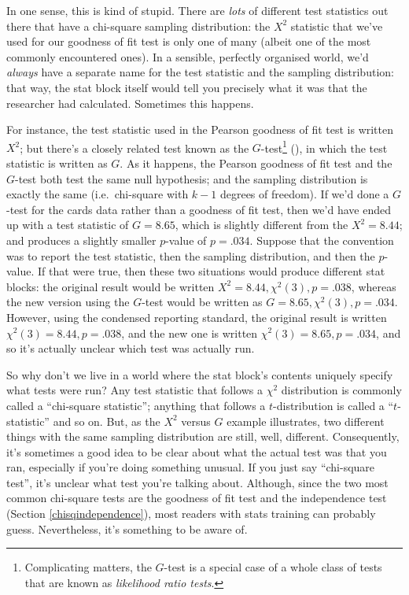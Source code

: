 \documentclass[
  11pt,
  a4paper,
  twoside,symmetric,openright]{book}
\theoremstyle{break}
\theoremstyle{break}
\begin{document}
In one sense, this is kind of stupid. There are \emph{lots} of different test statistics out there that have a chi-square sampling distribution: the \(X^2\) statistic that we've used for our goodness of fit test is only one of many (albeit one of the most commonly encountered ones). In a sensible, perfectly organised world, we'd \emph{always} have a separate name for the test statistic and the sampling distribution: that way, the stat block itself would tell you precisely what it was that the researcher had calculated. Sometimes this happens.

For instance, the test statistic used in the Pearson goodness of fit test is written \(X^2\); but there's a closely related test known as the \(G\)-test\footnote{Complicating matters, the \(G\)-test is a special case of a whole class of tests that are known as \emph{likelihood ratio tests}.} (), in which the test statistic is written as \(G\). As it happens, the Pearson goodness of fit test and the \(G\)-test both test the same null hypothesis; and the sampling distribution is exactly the same (i.e.~chi-square with \(k-1\) degrees of freedom). If we'd done a \(G\)-test for the cards data rather than a goodness of fit test, then we'd have ended up with a test statistic of \(G = 8.65\), which is slightly different from the \(X^2 = 8.44\); and produces a slightly smaller \(p\)-value of \(p = .034\). Suppose that the convention was to report the test statistic, then the sampling distribution, and then the \(p\)-value. If that were true, then these two situations would produce different stat blocks: the original result would be written \(X^2 = 8.44, \chi^2(3), p = .038\), whereas the new version using the \(G\)-test would be written as \(G = 8.65, \chi^2(3), p = .034\). However, using the condensed reporting standard, the original result is written \(\chi^2(3) = 8.44, p = .038\), and the new one is written \(\chi^2(3) = 8.65, p = .034\), and so it's actually unclear which test was actually run.

So why don't we live in a world where the stat block's contents uniquely specify what tests were run? Any test statistic that follows a \(\chi^2\) distribution is commonly called a ``chi-square statistic''; anything that follows a \(t\)-distribution is called a ``\(t\)-statistic'' and so on. But, as the \(X^2\) versus \(G\) example illustrates, two different things with the same sampling distribution are still, well, different. Consequently, it's sometimes a good idea to be clear about what the actual test was that you ran, especially if you're doing something unusual. If you just say ``chi-square test'', it's unclear what test you're talking about. Although, since the two most common chi-square tests are the goodness of fit test and the independence test (Section \ref{chisqindependence}), most readers with stats training can probably guess. Nevertheless, it's something to be aware of.
\end{document}
